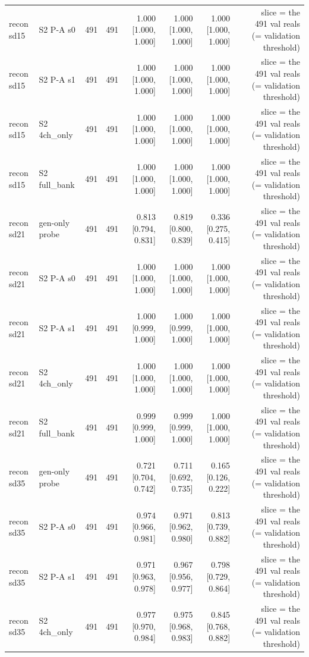 \begin{table}[htbp]
\begin{tabular}{llrrrrrrr}
recon sd15 & S2 P-A s0 & 491 & 491 & 1.000 [1.000, 1.000] & 1.000 [1.000, 1.000] & 1.000 [1.000, 1.000] &  & slice = the 491 val reals (= validation threshold) \\
recon sd15 & S2 P-A s1 & 491 & 491 & 1.000 [1.000, 1.000] & 1.000 [1.000, 1.000] & 1.000 [1.000, 1.000] &  & slice = the 491 val reals (= validation threshold) \\
recon sd15 & S2 4ch\_only & 491 & 491 & 1.000 [1.000, 1.000] & 1.000 [1.000, 1.000] & 1.000 [1.000, 1.000] &  & slice = the 491 val reals (= validation threshold) \\
recon sd15 & S2 full\_bank & 491 & 491 & 1.000 [1.000, 1.000] & 1.000 [1.000, 1.000] & 1.000 [1.000, 1.000] &  & slice = the 491 val reals (= validation threshold) \\
recon sd21 & gen-only probe & 491 & 491 & 0.813 [0.794, 0.831] & 0.819 [0.800, 0.839] & 0.336 [0.275, 0.415] &  & slice = the 491 val reals (= validation threshold) \\
recon sd21 & S2 P-A s0 & 491 & 491 & 1.000 [1.000, 1.000] & 1.000 [1.000, 1.000] & 1.000 [1.000, 1.000] &  & slice = the 491 val reals (= validation threshold) \\
recon sd21 & S2 P-A s1 & 491 & 491 & 1.000 [0.999, 1.000] & 1.000 [0.999, 1.000] & 1.000 [1.000, 1.000] &  & slice = the 491 val reals (= validation threshold) \\
recon sd21 & S2 4ch\_only & 491 & 491 & 1.000 [1.000, 1.000] & 1.000 [1.000, 1.000] & 1.000 [1.000, 1.000] &  & slice = the 491 val reals (= validation threshold) \\
recon sd21 & S2 full\_bank & 491 & 491 & 0.999 [0.999, 1.000] & 0.999 [0.999, 1.000] & 1.000 [1.000, 1.000] &  & slice = the 491 val reals (= validation threshold) \\
recon sd35 & gen-only probe & 491 & 491 & 0.721 [0.704, 0.742] & 0.711 [0.692, 0.735] & 0.165 [0.126, 0.222] &  & slice = the 491 val reals (= validation threshold) \\
recon sd35 & S2 P-A s0 & 491 & 491 & 0.974 [0.966, 0.981] & 0.971 [0.962, 0.980] & 0.813 [0.739, 0.882] &  & slice = the 491 val reals (= validation threshold) \\
recon sd35 & S2 P-A s1 & 491 & 491 & 0.971 [0.963, 0.978] & 0.967 [0.956, 0.977] & 0.798 [0.729, 0.864] &  & slice = the 491 val reals (= validation threshold) \\
recon sd35 & S2 4ch\_only & 491 & 491 & 0.977 [0.970, 0.984] & 0.975 [0.968, 0.983] & 0.845 [0.768, 0.882] &  & slice = the 491 val reals (= validation threshold) \\

\end{tabular}
\end{table}
